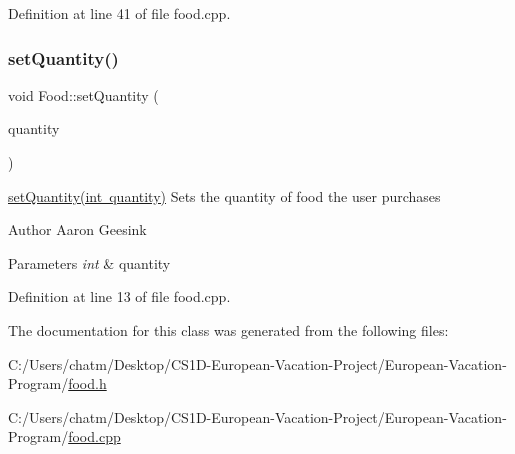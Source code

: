 Definition at line 41 of file food.\+cpp.

\mbox{\label{class_food_aa29cc2869e2607983876962343c12809}} 
\subsubsection{\texorpdfstring{setQuantity()}{setQuantity()}}
{\footnotesize\ttfamily void Food\+::set\+Quantity (\begin{DoxyParamCaption}\item[{int}]{quantity }\end{DoxyParamCaption})}



\mbox{\hyperlink{class_food_aa29cc2869e2607983876962343c12809}{set\+Quantity(int quantity)}} Sets the quantity of food the user purchases 

\begin{DoxyAuthor}{Author}
Aaron Geesink 
\end{DoxyAuthor}

\begin{DoxyParams}{Parameters}
{\em int} & quantity \\
\hline
\end{DoxyParams}


Definition at line 13 of file food.\+cpp.



The documentation for this class was generated from the following files\+:\begin{DoxyCompactItemize}
\item 
C\+:/\+Users/chatm/\+Desktop/\+C\+S1\+D-\/\+European-\/\+Vacation-\/\+Project/\+European-\/\+Vacation-\/\+Program/\mbox{\hyperlink{food_8h}{food.\+h}}\item 
C\+:/\+Users/chatm/\+Desktop/\+C\+S1\+D-\/\+European-\/\+Vacation-\/\+Project/\+European-\/\+Vacation-\/\+Program/\mbox{\hyperlink{food_8cpp}{food.\+cpp}}\end{DoxyCompactItemize}
